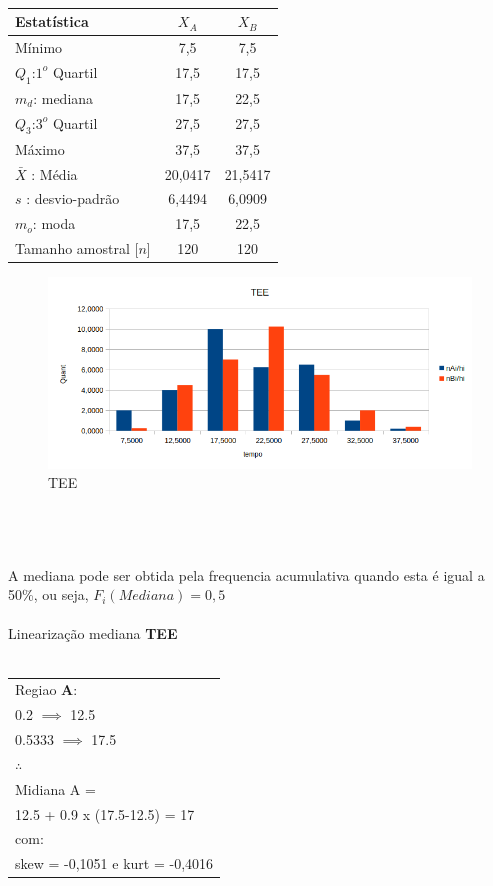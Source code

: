 \\
\begin{minipage}[!b]{0.40\linewidth}
\begin{tabular}{ l c c }
\hline
Estatística & $X_A$ & $X_B$ \\
\hline
Mínimo & 7,5 & 7,5\\
$Q_1$:$1^o$ Quartil & 17,5 & 17,5 \\
$m_d$: mediana & 17,5 & 22,5\\
$Q_3$:$3^o$ Quartil & 27,5 & 27,5 \\
Máximo & 37,5 & 37,5 \\
\hline
$\bar{X}$ : Média & 20,0417 & 21,5417 \\
$s$ : desvio-padrão & 6,4494 & 6,0909\\
$m_o$: moda & 17,5 & 22,5\\
\hline
Tamanho amostral [$n$] & 120 & 120 \\
\hline
\end{tabular}
\label{Tab:Resulatdos}
\end{minipage}
\hspace{2cm}
\begin{minipage}[!b]{0.40\linewidth}
\begin{figure}[H]
\centering
\includegraphics[scale=0.5]{./image/TEE.png}
\caption{TEE}
\label{TEE}
\end{figure}
\end{minipage}
\\
\\
\\
\noindent
A mediana pode ser obtida pela frequencia acumulativa quando esta é igual a 50\%, ou seja, $F_i(Mediana)=0,5$ \\
\\
Linearização mediana \textbf{TEE}\\
\\
\begin{minipage}[l]{0pt}
\begin{tabular}{l}
Regiao \textbf{A}:\\
0.2 $\implies$ 12.5 \\
0.5333 $\implies$ 17.5 \\
$\therefore$\\
Midiana A = \\
12.5 + 0.9 x (17.5-12.5) = 17 \\
com: \\
skew = -0,1051 e kurt = -0,4016 \\
\end{tabular}
\end{minipage} \hspace{10cm}
